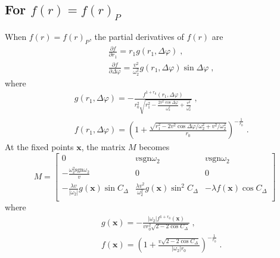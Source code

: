 \documentclass{article}
\begin{document}
\subsection{For $f\left( r \right) = f\left( r \right) _P$}

When $f\left( r \right) = f\left( r \right) _P$, the partial derivatives of $f\left( r \right)$ are
\begin{eqnarray}
    &&\frac{\partial f}{\partial r_1}=r_1g\left( r_1,\Delta \varphi \right)\;,
    \\
    &&\frac{\partial f}{\partial \Delta \varphi}=\frac{v^2}{\omega _{2}^{2}}g\left( r_1,\Delta \varphi \right) \sin \Delta \varphi\;,
\end{eqnarray}
where
\begin{eqnarray}
    &&g\left( r_1,\Delta \varphi \right) =-\frac{f^{1+r_0}\left( r_1,\Delta \varphi \right)}{r_{0}^{2}\sqrt{r_{1}^{2}-\frac{2v^2\cos \Delta \varphi}{\omega _{2}^{2}}+\frac{v^2}{\omega _{2}^{2}}}}\;,
    \\
    &&f\left( r_1,\Delta \varphi \right) =\left( 1+\frac{\sqrt{r_{1}^{2}-2v^2\cos \Delta \varphi /\omega _{2}^{2}+v^2/\omega _{2}^{2}}}{r_0} \right) ^{-\frac{1}{r_0}}\;.
\end{eqnarray}
At the fixed points $\mathbf{x}$, the matrix $M$ becomes
\begin{equation}
    M=\left[ \begin{matrix}
        0&		v\text{sgn} \omega _2&		v\text{sgn} \omega _2\\
        -\frac{\omega _{2}^{2}\text{sgn} \omega _2}{v}&		0&		0\\
        -\frac{\lambda v}{|\omega _2|}g\left( \mathbf{x} \right) \sin C_{\Delta}&		\frac{\lambda v^2}{\omega _{2}^{2}}g\left( \mathbf{x} \right) \sin ^2C_{\Delta}&		-\lambda f\left( \mathbf{x} \right) \cos C_{\Delta}\\
    \end{matrix} \right] 
\end{equation}
where
\begin{eqnarray}
    &&g\left( \mathbf{x} \right) =-\frac{\left| \omega _2 \right|f^{1+r_0}\left( \mathbf{x} \right)}{vr_{0}^{2}\sqrt{2-2\cos C_{\Delta}}}\;,\\
    &&f\left( \mathbf{x} \right) =\left( 1+\frac{v\sqrt{2-2\cos C_{\Delta}}}{\left| \omega _2 \right|r_0} \right) ^{-\frac{1}{r_0}}\;.
\end{eqnarray}

\end{document}
